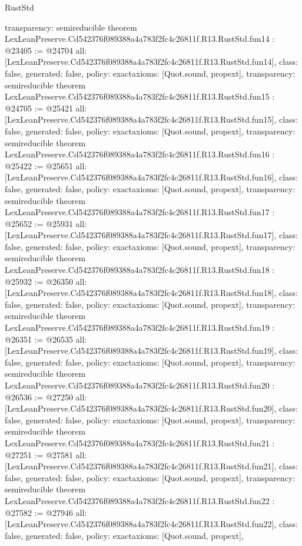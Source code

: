 \begin{lexlean}{RustStd}
\begin{coremodule}
{  transparency: semireducible
}
theorem LexLeanPreserve.Cd542376f089388a4a783f2fc4c26811f.R13.RustStd.fun14 : @23405 := @24704 {
  all: [LexLeanPreserve.Cd542376f089388a4a783f2fc4c26811f.R13.RustStd.fun14],
  class: false,
  generated: false,
  policy: exact{axioms: [Quot.sound, propext]},
  transparency: semireducible
}
theorem LexLeanPreserve.Cd542376f089388a4a783f2fc4c26811f.R13.RustStd.fun15 : @24705 := @25421 {
  all: [LexLeanPreserve.Cd542376f089388a4a783f2fc4c26811f.R13.RustStd.fun15],
  class: false,
  generated: false,
  policy: exact{axioms: [Quot.sound, propext]},
  transparency: semireducible
}
theorem LexLeanPreserve.Cd542376f089388a4a783f2fc4c26811f.R13.RustStd.fun16 : @25422 := @25651 {
  all: [LexLeanPreserve.Cd542376f089388a4a783f2fc4c26811f.R13.RustStd.fun16],
  class: false,
  generated: false,
  policy: exact{axioms: [Quot.sound, propext]},
  transparency: semireducible
}
theorem LexLeanPreserve.Cd542376f089388a4a783f2fc4c26811f.R13.RustStd.fun17 : @25652 := @25931 {
  all: [LexLeanPreserve.Cd542376f089388a4a783f2fc4c26811f.R13.RustStd.fun17],
  class: false,
  generated: false,
  policy: exact{axioms: [Quot.sound, propext]},
  transparency: semireducible
}
theorem LexLeanPreserve.Cd542376f089388a4a783f2fc4c26811f.R13.RustStd.fun18 : @25932 := @26350 {
  all: [LexLeanPreserve.Cd542376f089388a4a783f2fc4c26811f.R13.RustStd.fun18],
  class: false,
  generated: false,
  policy: exact{axioms: [Quot.sound, propext]},
  transparency: semireducible
}
theorem LexLeanPreserve.Cd542376f089388a4a783f2fc4c26811f.R13.RustStd.fun19 : @26351 := @26535 {
  all: [LexLeanPreserve.Cd542376f089388a4a783f2fc4c26811f.R13.RustStd.fun19],
  class: false,
  generated: false,
  policy: exact{axioms: [Quot.sound, propext]},
  transparency: semireducible
}
theorem LexLeanPreserve.Cd542376f089388a4a783f2fc4c26811f.R13.RustStd.fun20 : @26536 := @27250 {
  all: [LexLeanPreserve.Cd542376f089388a4a783f2fc4c26811f.R13.RustStd.fun20],
  class: false,
  generated: false,
  policy: exact{axioms: [Quot.sound, propext]},
  transparency: semireducible
}
theorem LexLeanPreserve.Cd542376f089388a4a783f2fc4c26811f.R13.RustStd.fun21 : @27251 := @27581 {
  all: [LexLeanPreserve.Cd542376f089388a4a783f2fc4c26811f.R13.RustStd.fun21],
  class: false,
  generated: false,
  policy: exact{axioms: [Quot.sound, propext]},
  transparency: semireducible
}
theorem LexLeanPreserve.Cd542376f089388a4a783f2fc4c26811f.R13.RustStd.fun22 : @27582 := @27946 {
  all: [LexLeanPreserve.Cd542376f089388a4a783f2fc4c26811f.R13.RustStd.fun22],
  class: false,
  generated: false,
  policy: exact{axioms: [Quot.sound, propext]},
}
\end{coremodule}
\end{lexlean}
